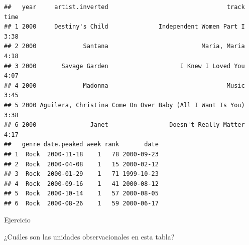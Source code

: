 \documentclass[]{article}
\newenvironment{Shaded}{\begin{snugshade}}{\end{snugshade}}
\newcommand{\KeywordTok}[1]{\textcolor[rgb]{0.13,0.29,0.53}{\textbf{{#1}}}}
\newcommand{\DataTypeTok}[1]{\textcolor[rgb]{0.13,0.29,0.53}{{#1}}}
\newcommand{\DecValTok}[1]{\textcolor[rgb]{0.00,0.00,0.81}{{#1}}}
\newcommand{\StringTok}[1]{\textcolor[rgb]{0.31,0.60,0.02}{{#1}}}
\newcommand{\OtherTok}[1]{\textcolor[rgb]{0.56,0.35,0.01}{{#1}}}
\newcommand{\NormalTok}[1]{{#1}}
\begin{document}
\begin{Shaded}
\end{Shaded}

\begin{verbatim}
##   year     artist.inverted                                 track time
## 1 2000     Destiny's Child              Independent Women Part I 3:38
## 2 2000             Santana                          Maria, Maria 4:18
## 3 2000       Savage Garden                    I Knew I Loved You 4:07
## 4 2000             Madonna                                 Music 3:45
## 5 2000 Aguilera, Christina Come On Over Baby (All I Want Is You) 3:38
## 6 2000               Janet                 Doesn't Really Matter 4:17
##   genre date.peaked week rank       date
## 1  Rock  2000-11-18    1   78 2000-09-23
## 2  Rock  2000-04-08    1   15 2000-02-12
## 3  Rock  2000-01-29    1   71 1999-10-23
## 4  Rock  2000-09-16    1   41 2000-08-12
## 5  Rock  2000-10-14    1   57 2000-08-05
## 6  Rock  2000-08-26    1   59 2000-06-17
\end{verbatim}

\renewcommand\bcStyleTitre[1]{\large\textcolor{bbblack}{#1}}

\begin{bclogo}[
  couleur=llred,
  arrondi=0,
  logo=\bcstop,
  barre=none,
  noborder=true]{Ejercicio}
  
¿Cuáles son las unidades observacionales en esta tabla?
\end{bclogo}
\end{document}
